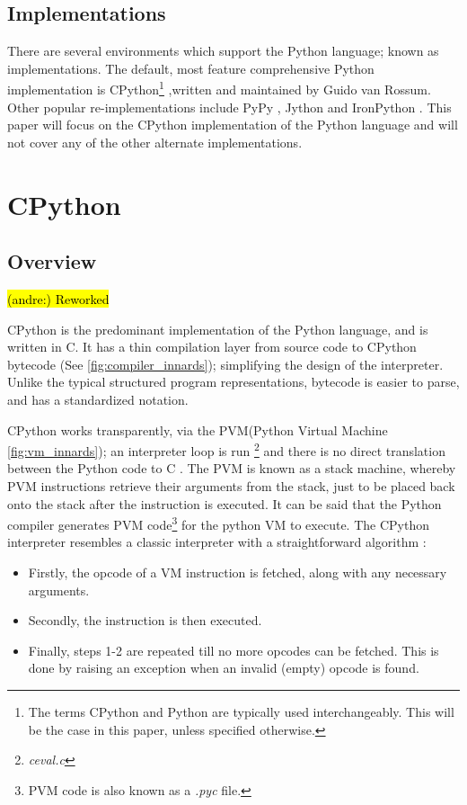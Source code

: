 \documentclass[12pt, a4paper]{report}
\DeclareRobustCommand{\andre}[1]{ {\begingroup\sethlcolor{BurntOrange}\hl{(andre:) #1}\endgroup} }
\theoremstyle{definition}
\theoremstyle{definition}%
\theoremstyle{definition}%
\theoremstyle{definition}%
\theoremstyle{definition}%
\theoremstyle{definition}%
\begin{document}
        \subsection{Implementations}
        \par There are several environments which support the Python language; known as implementations. The default, most feature comprehensive Python implementation is 
        CPython\footnote{The terms CPython and Python are typically used interchangeably. This will be the case in this paper, unless specified otherwise.} \cite{vanrossum1995python} ,written and maintained by Guido van Rossum. Other popular re-implementations include PyPy \cite{bolz2009tracing}, 
        Jython \cite{juneau2010definitive} and IronPython \cite{mueller2010professional}. This paper will focus on the CPython implementation of the Python language and
        will not cover any of the other alternate implementations.

    \section{CPython}
        \subsection{Overview}
        \andre{Reworked}
        \par CPython is the predominant implementation of the Python language, and is written in C. It has a thin compilation layer from source code to CPython bytecode (See \ref{fig:compiler_innards}); simplifying the design of the interpreter.
        Unlike the typical structured program representations, bytecode is easier to parse, and has a standardized notation.
        \par CPython works transparently, via the PVM(Python Virtual Machine \ref{fig:vm_innards}); an interpreter loop is run \footnote{\label{footnote:ceval}\textit{ceval.c}} and there is no direct translation between the Python code to C \cite[pp.1--2]{aycock1998converting}. 
        The PVM is known as a stack machine, whereby PVM instructions retrieve their arguments from the stack, just to be placed back onto the stack after the instruction is executed. It can be said that the Python compiler generates PVM code\footnote{PVM code is also known as a \textit{.pyc} file.} for the python VM to execute.
        The CPython interpreter resembles a classic interpreter with a straightforward algorithm \cite[pp.2--4]{aycock1998converting}: 
        \begin{itemize}
            \item[1.] Firstly, the opcode of a VM instruction is fetched, along with any necessary arguments.
            \item[2.] Secondly, the instruction is then executed.
            \item[3.] Finally, steps 1-2 are repeated till no more opcodes can be fetched. This is done by raising an exception when an invalid (empty) opcode is found.  
        \end{itemize}
\end{document}
